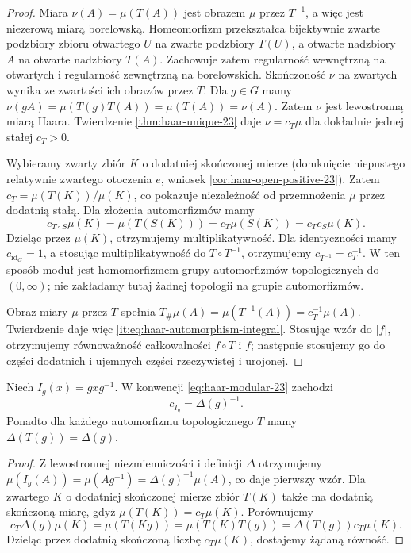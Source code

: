 \begin{proof}
Miara $\nu(A)=\mu(T(A))$ jest obrazem $\mu$ przez
$T^{-1}$, a więc jest niezerową miarą borelowską.
Homeomorfizm przekształca bijektywnie zwarte
podzbiory zbioru otwartego $U$ na zwarte podzbiory
$T(U)$, a otwarte nadzbiory $A$ na otwarte
nadzbiory $T(A)$. Zachowuje zatem regularność
wewnętrzną na otwartych i regularność zewnętrzną
na borelowskich. Skończoność $\nu$ na zwartych
wynika ze zwartości ich obrazów przez $T$.
Dla $g\in G$ mamy
$\nu(gA)=\mu(T(g)T(A))=\mu(T(A))=\nu(A)$.
Zatem $\nu$ jest lewostronną miarą Haara.
Twierdzenie \ref{thm:haar-unique-23} daje
$\nu=c_T\mu$ dla dokładnie jednej stałej $c_T>0$.

Wybieramy zwarty zbiór $K$ o dodatniej skończonej
mierze (domknięcie niepustego relatywnie zwartego
otoczenia $e$, wniosek
\ref{cor:haar-open-positive-23}). Zatem
$c_T=\mu(T(K))/\mu(K)$, co pokazuje niezależność
od przemnożenia $\mu$ przez dodatnią stałą.
Dla złożenia automorfizmów mamy
\[
 c_{T\circ S}\mu(K)=\mu(T(S(K)))
 =c_T\mu(S(K))=c_Tc_S\mu(K).
\]
Dzieląc przez $\mu(K)$, otrzymujemy multiplikatywność.
Dla identyczności mamy $c_{\operatorname{id}_G}=1$,
a stosując multiplikatywność do $T\circ T^{-1}$,
otrzymujemy $c_{T^{-1}}=c_T^{-1}$.
W ten sposób moduł jest homomorfizmem grupy
automorfizmów topologicznych do $(0,\infty)$;
nie zakładamy tutaj żadnej topologii na grupie
automorfizmów.

Obraz miary $\mu$ przez $T$ spełnia
$T_\#\mu(A)=\mu(T^{-1}(A))=c_T^{-1}\mu(A)$.
Twierdzenie 
daje więc \eqref{it:eq:haar-automorphism-integral}.
Stosując wzór do $|f|$, otrzymujemy równoważność
całkowalności $f\circ T$ i $f$; następnie stosujemy
go do części dodatnich i ujemnych części
rzeczywistej i urojonej.
\end{proof}

\begin{wniosek}
\label{it:cor:haar-inner-module}
Niech $I_g(x)=gxg^{-1}$. W konwencji
\eqref{eq:haar-modular-23} zachodzi
\[
 c_{I_g}=\Delta(g)^{-1}.
\]
Ponadto dla każdego automorfizmu topologicznego $T$
mamy $\Delta(T(g))=\Delta(g)$.
\end{wniosek}
\begin{proof}
Z lewostronnej niezmienniczości i definicji
$\Delta$ otrzymujemy
$\mu(I_g(A))=\mu(Ag^{-1})=\Delta(g)^{-1}\mu(A)$,
co daje pierwszy wzór.
Dla zwartego $K$ o dodatniej skończonej mierze
zbiór $T(K)$ także ma dodatnią skończoną miarę,
gdyż $\mu(T(K))=c_T\mu(K)$. Porównujemy
\[
 c_T\Delta(g)\mu(K)=\mu(T(Kg))
 =\mu(T(K)T(g))
 =\Delta(T(g))c_T\mu(K).
\]
Dzieląc przez dodatnią skończoną liczbę
$c_T\mu(K)$, dostajemy żądaną równość.
\end{proof}


